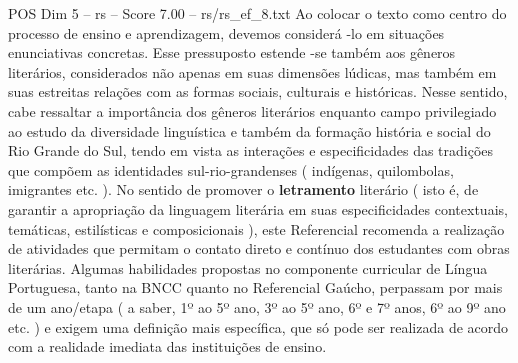 \begin{textsample}{POS Dim 5 – rs – Score 7.00 – rs/rs\_ef\_8.txt}
Ao colocar o texto como centro do processo de ensino e aprendizagem, devemos considerá -lo em situações enunciativas concretas.
Esse pressuposto estende -se também aos gêneros literários, considerados não apenas em suas dimensões lúdicas, mas também em suas estreitas relações com as formas sociais, culturais e históricas.
Nesse sentido, cabe ressaltar a importância dos gêneros literários enquanto campo privilegiado ao estudo da diversidade linguística e também da formação história e social do Rio Grande do Sul, tendo em vista as interações e especificidades das tradições que compõem as identidades sul-rio-grandenses ( indígenas, quilombolas, imigrantes etc. ).
No sentido de promover o \textbf{letramento} literário ( isto é, de garantir a apropriação da linguagem literária em suas especificidades contextuais, temáticas, estilísticas e composicionais ), este Referencial recomenda a realização de atividades que permitam o contato direto e contínuo dos estudantes com obras literárias.
Algumas habilidades propostas no componente curricular de Língua Portuguesa, tanto na BNCC quanto no Referencial Gaúcho, perpassam por mais de um ano/etapa ( a saber, 1º ao 5º ano, 3º ao 5º ano, 6º e 7º anos, 6º ao 9º ano etc. ) e exigem uma definição mais específica, que só pode ser realizada de acordo com a realidade imediata das instituições de ensino.

\end{textsample}
